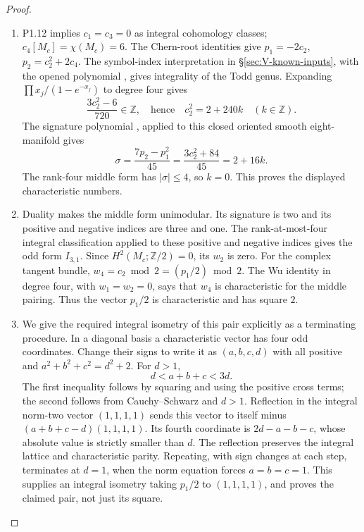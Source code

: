 \documentclass[11pt,a4paper]{article}
\theoremstyle{definition}
\begin{document}
\begin{proof}
\begin{enumerate}[label=\arabic*.]
\item P1.12 implies $c_1=c_3=0$ as integral cohomology classes;
$c_4[M_c]=\chi(M_c)=6$.  The Chern-root identities give
$p_1=-2c_2$, $p_2=c_2^2+2c_4$.
The symbol-index interpretation in \S\ref{sec:V-known-inputs},
with the opened polynomial \cite[equation (1.2), p.~3]{ffEsoleKang},
gives integrality of the Todd genus. Expanding
$\prod x_j/(1-e^{-x_j})$ to degree four gives
\[
\frac{3c_2^2-6}{720}\in\mathbb Z,
\quad\text{hence}\quad c_2^2=2+240k\quad(k\in\mathbb Z).
\]
The signature polynomial \cite[equation (1.4), p.~4]{ffEsoleKang}, applied to
this closed oriented smooth eight-manifold gives
\[
\sigma=\frac{7p_2-p_1^2}{45}
      =\frac{3c_2^2+84}{45}=2+16k.
\]
The rank-four middle form has $|\sigma|\leq4$, so $k=0$.
This proves the displayed characteristic numbers.

\item Duality makes the middle form unimodular.  Its signature is two and
its positive and negative indices are three and one.  The rank-at-most-four integral classification
\cite[Theorem 2.2.1, p.~61]{ffPetersSterk} applied to these
positive and negative indices gives the odd form \(I_{3,1}\).
Since $H^2(M_c;\mathbb Z/2)=0$, its $w_2$ is zero.
For the complex tangent bundle,
$w_4=c_2\bmod2=(p_1/2)\bmod2$.
The Wu identity in degree four, with $w_1=w_2=0$, says that $w_4$ is
characteristic for the middle pairing.  Thus the vector $p_1/2$ is
characteristic and has square $2$.

\item We give the required integral isometry of this pair explicitly as
a terminating procedure.  In a diagonal basis a characteristic vector
has four odd coordinates.  Change their signs to write it as
$(a,b,c,d)$ with all positive and
$a^2+b^2+c^2=d^2+2$.
For $d>1$,
\[
d<a+b+c<3d.
\]
The first inequality follows by squaring and using the positive cross
terms; the second follows from Cauchy--Schwarz and $d>1$.
Reflection in the integral norm-two vector $(1,1,1,1)$ sends this
vector to itself minus $(a+b+c-d)(1,1,1,1)$.
Its fourth coordinate is $2d-a-b-c$, whose absolute value is strictly
smaller than $d$.  The reflection preserves the integral lattice and
characteristic parity.  Repeating, with sign changes at each step,
terminates at $d=1$, when the norm equation forces $a=b=c=1$.
This supplies an integral isometry taking $p_1/2$ to $(1,1,1,1)$,
and proves the claimed pair, not just its square.

\end{enumerate}
\end{proof}
\end{document}
